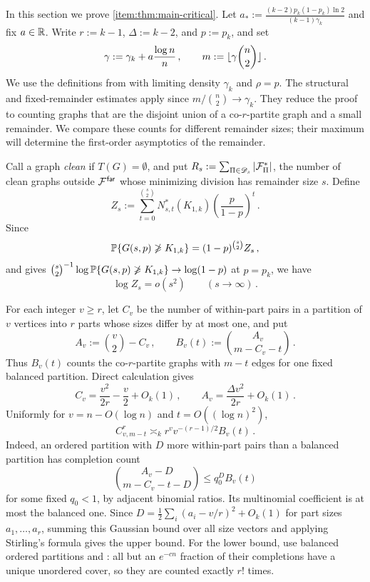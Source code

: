 In this section we prove  \ref{item:thm:main-critical}. Let $a_\ast:=\frac{(k-2)p_k(1-p_k)\ln2}{(k-1)\gamma_k}$ and fix $a\in{\mathbb R}$. Write $r:=k-1$, $\Delta:=k-2$, and $p:=p_k$, and set
$$\gamma:=\gamma_k+a\frac{\log n}{n}\,,\qquad m:=\lfloor\gamma\binom n2\rfloor\,.$$
We use the definitions from  with limiting density $\gamma_k$ and $\rho=p$. The structural and fixed-remainder estimates apply since $m/\binom n2\to\gamma_k$. They reduce the proof to counting graphs that are the disjoint union of a co-$r$-partite graph and a small remainder. We compare these counts for different remainder sizes; their maximum will determine the first-order asymptotics of the remainder.

Call a graph \emph{clean} if $T(G)=\emptyset$, and put $R_s:=\sum_{\Pi\in{\mathscr D}_s}|{\mathcal F}^\ast_\Pi|$, the number of clean graphs outside ${\mathcal F}^{\hspace{0.2mm}\mathsf{far}}$ whose minimizing division has remainder size $s$. Define
$$Z_s:=\sum_{t=0}^{\binom s2}N^\ast_{s,t}(K_{1,k})\left(\frac{p}{1-p}\right)^t\,.$$
Since
$${\mathbb P}\{G(s,p)\not\geqslant K_{1,k}\}=(1-p)^{\binom s2}Z_s\,,$$
and  gives $\binom s2^{-1}\log{\mathbb P}\{G(s,p)\not\geqslant K_{1,k}\}\to\log(1-p)$ at $p=p_k$, we have
\begin{equation}\label{eqn:critical-remainder-partition}
\log Z_s=o(s^2)\qquad(s\to\infty)\,.
\end{equation}

For each integer $v\geq r$, let $C_v$ be the number of within-part pairs in a partition of $v$ vertices into $r$ parts whose sizes differ by at most one, and put
\begin{equation}\label{eqn:balanced-completion-counts}
A_v:=\binom v2-C_v\,,\qquad B_v(t):=\binom{A_v}{m-C_v-t}\,.
\end{equation}
Thus $B_v(t)$ counts the co-$r$-partite graphs with $m-t$ edges for one fixed balanced partition. Direct calculation gives
\begin{equation}\label{eqn:balanced-pair-expansions}
C_v=\frac{v^2}{2r}-\frac v2+O_k(1)\,,\qquad A_v=\frac{\Delta v^2}{2r}+O_k(1)\,.
\end{equation}
Uniformly for $v=n-O(\log n)$ and $t=O((\log n)^2)$,
\begin{equation}\label{eqn:critical-copartite-comparison}
C^r_{v,m-t}\asymp_k r^v v^{-(r-1)/2}B_v(t)\,.
\end{equation}
Indeed, an ordered partition with $D$ more within-part pairs than a balanced partition has completion count
$$\binom{A_v-D}{m-C_v-t-D}\leq q_0^D B_v(t)$$
for some fixed $q_0<1$, by adjacent binomial ratios. Its multinomial coefficient is at most the balanced one. Since $D=\frac12\sum_i(a_i-v/r)^2+O_k(1)$ for part sizes $a_1,\dots,a_r$, summing this Gaussian bound over all size vectors and applying Stirling's formula gives the upper bound. For the lower bound, use balanced ordered partitions and : all but an $e^{-cn}$ fraction of their completions have a unique unordered cover, so they are counted exactly $r!$ times.

